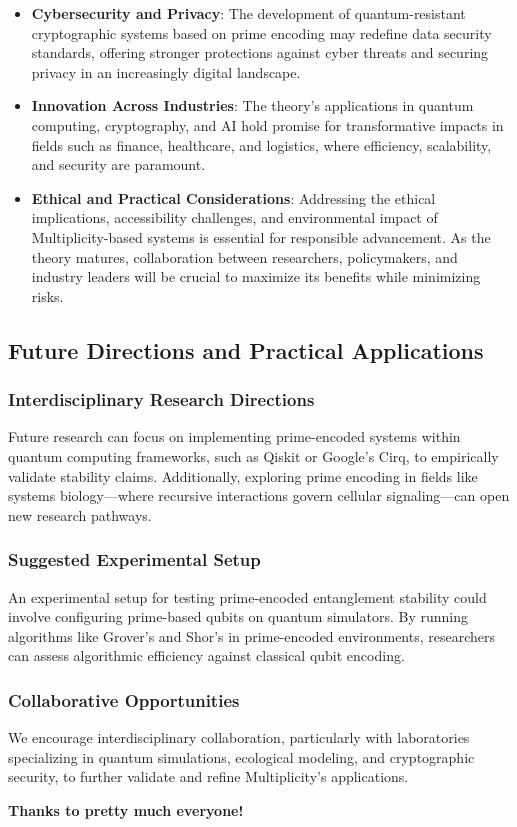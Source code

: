 \documentclass{article}
\begin{document}
\begin{itemize}
    \item \textbf{Cybersecurity and Privacy}: The development of quantum-resistant cryptographic systems based on prime encoding may redefine data security standards, offering stronger protections against cyber threats and securing privacy in an increasingly digital landscape.
    
    \item \textbf{Innovation Across Industries}: The theory’s applications in quantum computing, cryptography, and AI hold promise for transformative impacts in fields such as finance, healthcare, and logistics, where efficiency, scalability, and security are paramount.
    
    \item \textbf{Ethical and Practical Considerations}: Addressing the ethical implications, accessibility challenges, and environmental impact of Multiplicity-based systems is essential for responsible advancement. As the theory matures, collaboration between researchers, policymakers, and industry leaders will be crucial to maximize its benefits while minimizing risks.
\end{itemize}

\subsection{Future Directions and Practical Applications}
\subsubsection{Interdisciplinary Research Directions}
Future research can focus on implementing prime-encoded systems within quantum computing frameworks, such as Qiskit or Google’s Cirq, to empirically validate stability claims. Additionally, exploring prime encoding in fields like systems biology—where recursive interactions govern cellular signaling—can open new research pathways.

\subsubsection{Suggested Experimental Setup}
An experimental setup for testing prime-encoded entanglement stability could involve configuring prime-based qubits on quantum simulators. By running algorithms like Grover’s and Shor’s in prime-encoded environments, researchers can assess algorithmic efficiency against classical qubit encoding.

\subsubsection{Collaborative Opportunities}
We encourage interdisciplinary collaboration, particularly with laboratories specializing in quantum simulations, ecological modeling, and cryptographic security, to further validate and refine Multiplicity's applications. 



\nolinenumbers
\begin{center}
    \textbf{Thanks to pretty much everyone!}
\end{center}
\end{document}
